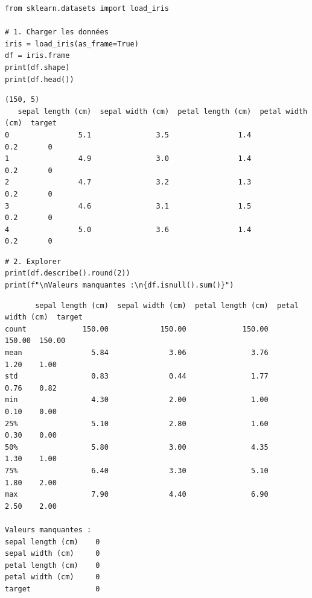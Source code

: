 \begin{codeblock}[title=\textbf{Python --- Charger et explorer Iris}]
\begin{verbatim}
from sklearn.datasets import load_iris

# 1. Charger les données
iris = load_iris(as_frame=True)
df = iris.frame
print(df.shape)
print(df.head())
\end{verbatim}
\end{codeblock}

\begin{codeoutput}
\begin{verbatim}
(150, 5)
   sepal length (cm)  sepal width (cm)  petal length (cm)  petal width (cm)  target
0                5.1               3.5                1.4               0.2       0
1                4.9               3.0                1.4               0.2       0
2                4.7               3.2                1.3               0.2       0
3                4.6               3.1                1.5               0.2       0
4                5.0               3.6                1.4               0.2       0
\end{verbatim}
\end{codeoutput}

\begin{codeblock}[title=\textbf{Python --- Statistiques descriptives}]
\begin{verbatim}
# 2. Explorer
print(df.describe().round(2))
print(f"\nValeurs manquantes :\n{df.isnull().sum()}")
\end{verbatim}
\end{codeblock}

\begin{codeoutput}
\begin{verbatim}
       sepal length (cm)  sepal width (cm)  petal length (cm)  petal width (cm)  target
count             150.00            150.00             150.00            150.00  150.00
mean                5.84              3.06               3.76              1.20    1.00
std                 0.83              0.44               1.77              0.76    0.82
min                 4.30              2.00               1.00              0.10    0.00
25%                 5.10              2.80               1.60              0.30    0.00
50%                 5.80              3.00               4.35              1.30    1.00
75%                 6.40              3.30               5.10              1.80    2.00
max                 7.90              4.40               6.90              2.50    2.00

Valeurs manquantes :
sepal length (cm)    0
sepal width (cm)     0
petal length (cm)    0
petal width (cm)     0
target               0
\end{verbatim}
\end{codeoutput}


